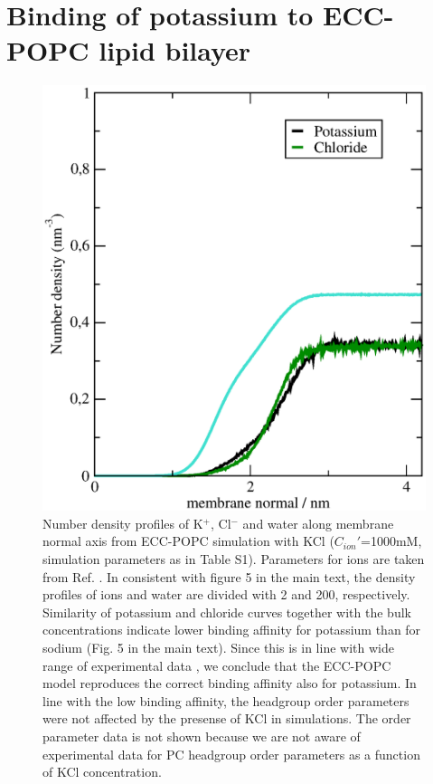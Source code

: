\documentclass[journal=jpcbfk]{achemso}
\begin{document}
\section{Binding of potassium to ECC-POPC lipid bilayer}
\begin{figure}[!h]
  \centering
  \includegraphics[width=13.0cm]{../Fig/density_profiles_KCl-water.eps}
  \caption{\label{Kdens}
    Number density profiles of K$^+$, Cl$^-$ and water along membrane normal
    axis from ECC-POPC simulation with KCl ($C_{ion}'$=1000mM, simulation parameters as in Table S1).
    Parameters for ions are taken from Ref. .
    In consistent with figure 5 in the main text, the density profiles of ions and water
    are divided with 2 and 200, respectively. Similarity of potassium
    and chloride curves together with the bulk concentrations indicate lower binding 
    affinity for potassium than for sodium (Fig. 5 in the main text).
    Since this is in line with wide range of experimental data \cite{eisenberg79,binder02,klasczyk10}, we conclude
    that the ECC-POPC model reproduces the correct binding affinity also for potassium.
    In line with the low binding affinity, the headgroup order parameters were not
    affected by the presense of KCl in simulations. The order parameter 
    data is not shown because we are not aware of experimental data for PC headgroup
    order parameters as a function of KCl concentration.
  }
\end{figure}

\newpage

\end{document}
